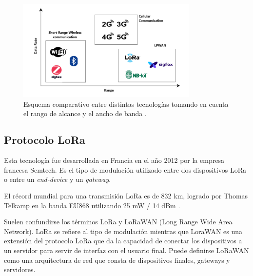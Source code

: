 \begin{figure}[H]
    \centering
    \includegraphics[width = 0.8\textwidth]{imagenes/cap1_marcoteo/CommPrtocolsComparison.png}
    \caption{Esquema comparativo entre distintas tecnologías tomando en cuenta el rango de alcance y el ancho de banda \citep{khorsandi2023performance}.}
    \label{fig:commcomparison}
\end{figure}

\subsection{Protocolo LoRa}
\label{sec:protocololora}

Esta tecnología fue desarrollada en Francia en el año 2012 por la empresa francesa Semtech. Es el tipo de modulación utilizado entre dos dispositivos LoRa o entre un \textit{end-device} y un \textit{gateway}. 

El récord mundial para una transmisión LoRa es de 832 km, logrado por Thomas Telkamp en la banda EU868 utilizando 25 mW / 14 dBm \citep{montagny2021lora}.

Suelen confundirse los términos LoRa y LoRaWAN (Long Range Wide Area Network). LoRa se refiere al tipo de modulación mientras que LoraWAN es una extensión del protocolo LoRa que da la capacidad de conectar los dispositivos a un servidor para servir de interfaz con el usuario final. Puede definirse LoRaWAN como una arquitectura de red que consta de dispositivos finales, gateways y servidores.

